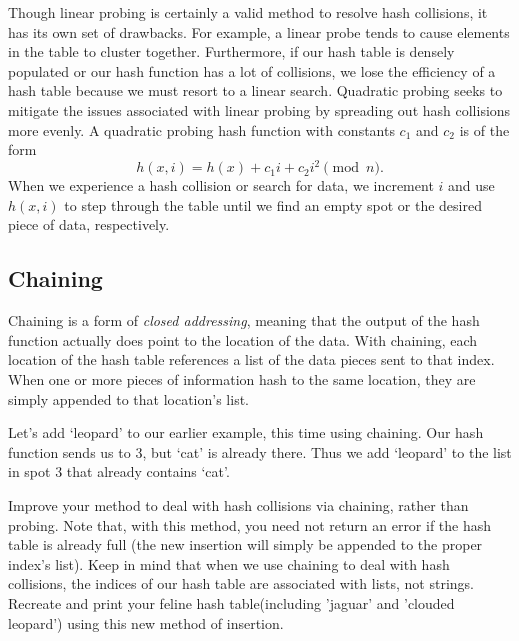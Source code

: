 Though linear probing is certainly a valid method to resolve hash collisions, it has its own set of drawbacks.
For example, a linear probe tends to cause elements in the table to cluster together.
Furthermore, if our hash table is densely populated or our hash function has a lot of collisions, we lose the efficiency of a hash table because we must resort to a linear search.
Quadratic probing seeks to mitigate the issues associated with linear probing by spreading out hash collisions more evenly.
A quadratic probing hash function with constants $c_1$ and $c_2$ is of the form
\begin{equation*}
h(x, i) = h(x) + c_1i + c_2i^2 \pmod{n}.
\end{equation*}
When we experience a hash collision or search for data, we increment $i$ and use $h(x,i)$ to step through the table until we find an empty spot or the desired piece of data, respectively.

\subsection*{Chaining}
Chaining is a form of \emph{closed addressing}, meaning that the output of the hash function actually does point to the location of the data.
With chaining, each location of the hash table references a list of the data pieces sent to that index.
When one or more pieces of information hash to the same location, they are simply appended to that location's list.

Let's add `leopard' to our earlier example, this time using chaining.
Our hash function sends us to 3, but `cat' is already there.
Thus we add `leopard' to the list in spot 3 that already contains `cat'.
\begin{figure}
\end{figure}

\begin{problem}
Improve your  method to deal with hash collisions via chaining, rather than probing. 
Note that, with this method, you need not return an error if the hash table is already full (the new insertion will simply be appended to the proper index's list). Keep in mind that when we use chaining to deal with hash collisions, the indices of our hash table are associated with lists, not strings.
Recreate and print your feline hash table(including 'jaguar' and 'clouded leopard') using this new method of insertion. 
\label{prob:Chaining insert}
\end{problem}

